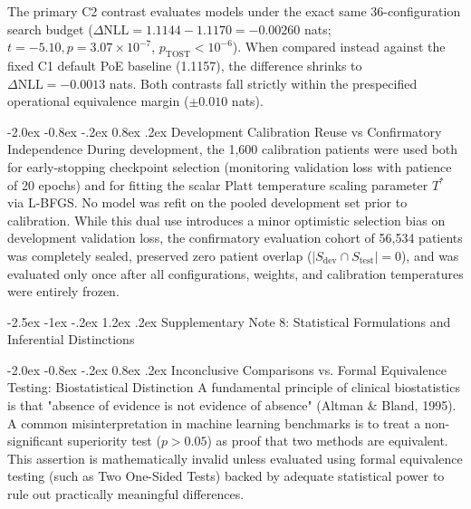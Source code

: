 \documentclass[10pt,a4paper]{article}
\makeatletter
\renewcommand{\section}{\@startsection{section}{1}{\z@}%
  {-2.5ex \@plus -1ex \@minus -.2ex}%
  {1.2ex \@plus.2ex}%
  {\normalfont\Large\sffamily\bfseries\color{naturedark}}}
\renewcommand{\subsection}{\@startsection{subsection}{2}{\z@}%
  {-2.0ex \@plus -0.8ex \@minus -.2ex}%
  {0.8ex \@plus.2ex}%
  {\normalfont\large\sffamily\bfseries\color{naturedark}}}
\makeatother
\begin{document}
The primary C2 contrast evaluates models under the exact same 36-configuration search budget ($\Delta\text{NLL} = 1.1144 - 1.1170 = \mathbf{-0.00260}$ nats; $t = -5.10, p = 3.07 \times 10^{-7}$, $p_{\text{TOST}} < 10^{-6}$). When compared instead against the fixed C1 default PoE baseline (1.1157), the difference shrinks to $\Delta\text{NLL} = -0.0013$ nats. Both contrasts fall strictly within the prespecified operational equivalence margin ($\pm 0.010$ nats).

\subsection{Development Calibration Reuse vs Confirmatory Independence}
During development, the 1,600 calibration patients were used both for early-stopping checkpoint selection (monitoring validation loss with patience of 20 epochs) and for fitting the scalar Platt temperature scaling parameter $T^*$ via L-BFGS. No model was refit on the pooled development set prior to calibration. While this dual use introduces a minor optimistic selection bias on development validation loss, the confirmatory evaluation cohort of 56,534 patients was completely sealed, preserved zero patient overlap ($|S_{\text{dev}} \cap S_{\text{test}}| = 0$), and was evaluated only once after all configurations, weights, and calibration temperatures were entirely frozen.

\newpage

\section{Supplementary Note 8: Statistical Formulations and Inferential Distinctions}

\subsection{Inconclusive Comparisons vs. Formal Equivalence Testing: Biostatistical Distinction}
A fundamental principle of clinical biostatistics is that "absence of evidence is not evidence of absence" (Altman \& Bland, 1995). A common misinterpretation in machine learning benchmarks is to treat a non-significant superiority test ($p > 0.05$) as proof that two methods are equivalent. This assertion is mathematically invalid unless evaluated using formal equivalence testing (such as Two One-Sided Tests) backed by adequate statistical power to rule out practically meaningful differences.
\end{document}
